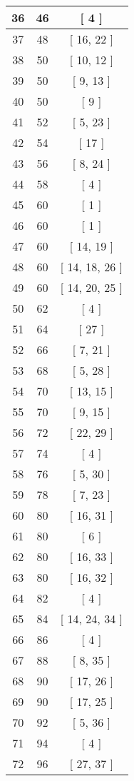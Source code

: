\begin{center}
\begin{longtable}[H]{|| c c c ||}
\hline
36 & 46 & [ 4 ] \\ 
\hline
37 & 48 & [ 16, 22 ] \\ 
\hline
38 & 50 & [ 10, 12 ] \\ 
\hline
39 & 50 & [ 9, 13 ] \\ 
\hline
40 & 50 & [ 9 ] \\ 
\hline
41 & 52 & [ 5, 23 ] \\ 
\hline
42 & 54 & [ 17 ] \\ 
\hline
43 & 56 & [ 8, 24 ] \\ 
\hline
44 & 58 & [ 4 ] \\ 
\hline
45 & 60 & [ 1 ] \\ 
\hline
46 & 60 & [ 1 ] \\ 
\hline
47 & 60 & [ 14, 19 ] \\ 
\hline
48 & 60 & [ 14, 18, 26 ] \\ 
\hline
49 & 60 & [ 14, 20, 25 ] \\ 
\hline
50 & 62 & [ 4 ] \\ 
\hline
51 & 64 & [ 27 ] \\ 
\hline
52 & 66 & [ 7, 21 ] \\ 
\hline
53 & 68 & [ 5, 28 ] \\ 
\hline
54 & 70 & [ 13, 15 ] \\ 
\hline
55 & 70 & [ 9, 15 ] \\ 
\hline
56 & 72 & [ 22, 29 ] \\ 
\hline
57 & 74 & [ 4 ] \\ 
\hline
58 & 76 & [ 5, 30 ] \\ 
\hline
59 & 78 & [ 7, 23 ] \\ 
\hline
60 & 80 & [ 16, 31 ] \\ 
\hline
61 & 80 & [ 6 ] \\ 
\hline
62 & 80 & [ 16, 33 ] \\ 
\hline
63 & 80 & [ 16, 32 ] \\ 
\hline
64 & 82 & [ 4 ] \\ 
\hline
65 & 84 & [ 14, 24, 34 ] \\ 
\hline
66 & 86 & [ 4 ] \\ 
\hline
67 & 88 & [ 8, 35 ] \\ 
\hline
68 & 90 & [ 17, 26 ] \\ 
\hline
69 & 90 & [ 17, 25 ] \\ 
\hline
70 & 92 & [ 5, 36 ] \\ 
\hline
71 & 94 & [ 4 ] \\ 
\hline
72 & 96 & [ 27, 37 ] \\ 

\end{longtable}
\end{center}
